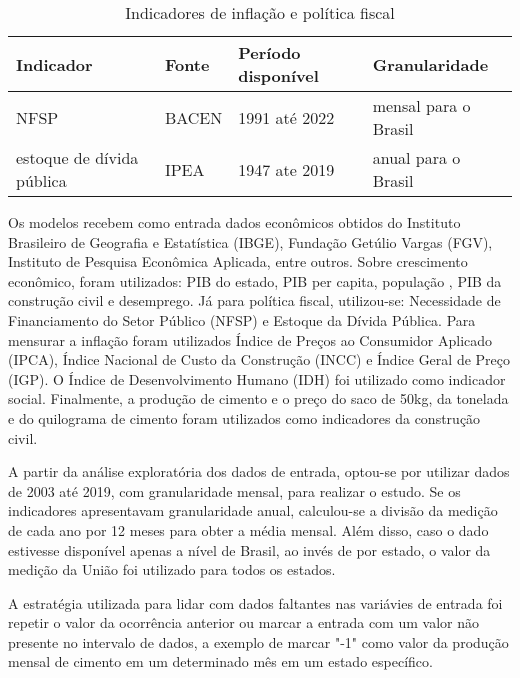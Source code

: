 \begin{table}
    \centering
    \caption{Indicadores de inflação e política fiscal}
    \begin{tabular}{llll}
        \toprule
        Indicador                   & Fonte & Período disponível & Granularidade         \\
        \midrule
        NFSP                        & BACEN  & 1991 até 2022      & mensal para o Brasil      \\
        estoque de dívida pública   & IPEA   & 1947 ate 2019      & anual para o Brasil      \\
        \bottomrule
    \end{tabular}
\end{table}

Os modelos recebem como entrada dados econômicos obtidos do Instituto Brasileiro de Geografia e Estatística (IBGE), Fundação Getúlio Vargas (FGV), Instituto de Pesquisa Econômica Aplicada, entre outros. Sobre crescimento econômico, foram utilizados: PIB do estado, PIB per capita, população , PIB da construção civil e desemprego. Já para política fiscal, utilizou-se: Necessidade de Financiamento do Setor Público (NFSP) e Estoque da Dívida Pública. Para mensurar a inflação foram utilizados Índice de Preços ao Consumidor Aplicado (IPCA), Índice Nacional de Custo da Construção (INCC) e Índice Geral de Preço (IGP). O Índice de Desenvolvimento Humano (IDH) foi utilizado como indicador social. Finalmente, a produção de cimento e o preço do saco de 50kg, da tonelada e do quilograma de cimento foram utilizados como indicadores da construção civil.



    A partir da análise exploratória dos dados de entrada, optou-se por utilizar dados de 2003 até 2019, com granularidade mensal, para realizar o estudo. Se os indicadores apresentavam granularidade anual, calculou-se a divisão da medição de cada ano por 12 meses para obter a média mensal. Além disso, caso o dado estivesse disponível apenas a nível de Brasil, ao invés de por estado, o valor da medição da União foi utilizado para todos os estados.
    
    A estratégia utilizada para lidar com dados faltantes nas variávies de entrada foi repetir o valor da ocorrência anterior ou marcar a entrada com um valor não presente no intervalo de dados, a exemplo de marcar "-1" como valor da produção mensal de cimento em um determinado mês em um estado específico.


